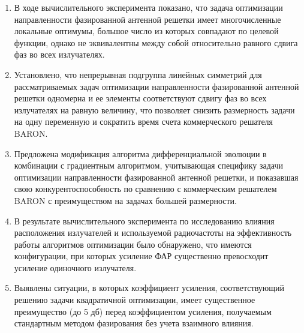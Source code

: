 \begin{enumerate}
  \item В ходе вычислительного эксперимента показано, что задача оптимизации направленности фазированной антенной решетки имеет многочисленные локальные оптимумы, большое число из которых совпадают по целевой функции, однако не эквивалентны между собой относительно равного сдвига фаз во всех излучателях.
  \item Установлено, что непрерывная подгруппа линейных симметрий для рассматриваемых задач оптимизации направленности фазированной антенной решетки одномерна и ее элементы соответствуют сдвигу фаз во всех излучателях на равную величину, что позволяет снизить размерность задачи на одну переменную и сократить время счета коммерческого решателя BARON.
 \item Предложена модификация алгоритма дифференциальной эволюции в комбинации с градиентным алгоритмом, учитывающая специфику задачи оптимизации направленности фазированной антенной решетки, и показавшая свою конкурентоспособность по сравнению с коммерческим решателем BARON с преимуществом на задачах большей размерности.
  \item В результате вычислительного эксперимента по исследованию влияния расположения излучателей и используемой радиочастоты на эффективность работы алгоритмов оптимизации было обнаружено, что имеются конфигурации, при которых усиление ФАР существенно превосходит усиление одиночного излучателя.
  \item Выявлены ситуации, в которых коэффициент усиления, соответствующий решению задачи квадратичной оптимизации, имеет существенное преимущество (до 5 дб) перед коэффициентом усиления, получаемым стандартным методом фазирования без учета взаимного влияния.
\end{enumerate}

